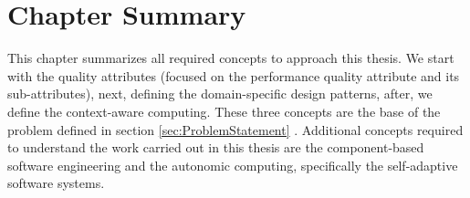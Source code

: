 




\section{Chapter Summary}
This chapter summarizes all required concepts to approach this thesis. We start with the quality attributes (focused on the performance quality attribute and its sub-attributes), next, defining the domain-specific design patterns, after, we define the context-aware computing. These three concepts are the base of the problem defined in section \ref{sec:ProblemStatement} . Additional concepts required to understand the work carried out in this thesis are the component-based software engineering and the autonomic computing, specifically the self-adaptive software systems.